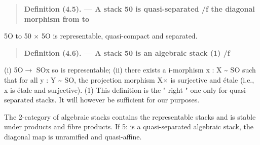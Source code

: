 \documentclass[11pt]{article}
\theoremstyle{plain}
\theoremstyle{definition}
\theoremstyle{remark}
\begin{document}
\begin{quote}\textbf{Definition (4.5). --- A stack 50 is quasi-separated /f the diagonal morphism from to}\end{quote}
5O to 50 $\times$ 5O is representable, quasi-compact and separated.

\begin{quote}\textbf{Definition (4.6). --- A stack 50 is an algebraic stack (1) /f}\end{quote}
(i) 5O$\to$ SOx so is representable; (ii) there exists a i-morphism x : X \textasciitilde{} SO such that for all y : Y \textasciitilde{} SO, the projection morphism X$\times$ is surjective and \'etale (i.e., x is \'etale and surjective). (1) This definition is the " right " one only for quasi-separated stacks. It will however be sufficient for our purposes.

The 2-category of algebraic stacks contains the representable stacks and is stable under products and fibre products. If 5: is a quasi-separated algebraic stack, the diagonal map is unramified and quasi-affine.
\end{document}

